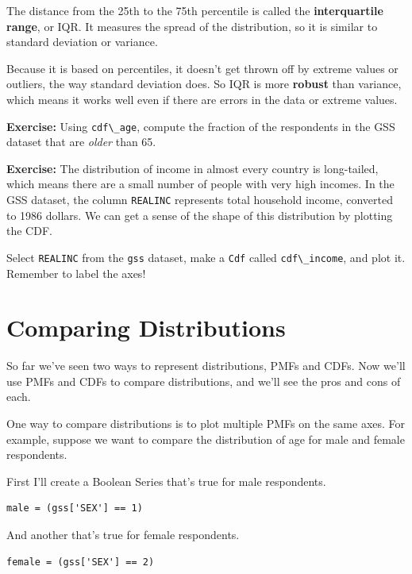 The distance from the 25th to the 75th percentile is called the
\textbf{interquartile range}, or IQR. It measures the spread of the
distribution, so it is similar to standard deviation or variance.

Because it is based on percentiles, it doesn't get thrown off by extreme
values or outliers, the way standard deviation does. So IQR is more
\textbf{robust} than variance, which means it works well even if there
are errors in the data or extreme values.

\textbf{Exercise:} Using \passthrough{\lstinline!cdf\_age!}, compute the
fraction of the respondents in the GSS dataset that are \emph{older}
than 65.

\textbf{Exercise:} The distribution of income in almost every country is
long-tailed, which means there are a small number of people with very
high incomes. In the GSS dataset, the column
\passthrough{\lstinline!REALINC!} represents total household income,
converted to 1986 dollars. We can get a sense of the shape of this
distribution by plotting the CDF.

Select \passthrough{\lstinline!REALINC!} from the
\passthrough{\lstinline!gss!} dataset, make a
\passthrough{\lstinline!Cdf!} called
\passthrough{\lstinline!cdf\_income!}, and plot it. Remember to label
the axes!

\hypertarget{comparing-distributions}{%
\section{Comparing Distributions}\label{comparing-distributions}}

So far we've seen two ways to represent distributions, PMFs and CDFs.
Now we'll use PMFs and CDFs to compare distributions, and we'll see the
pros and cons of each.

One way to compare distributions is to plot multiple PMFs on the same
axes. For example, suppose we want to compare the distribution of age
for male and female respondents.

First I'll create a Boolean Series that's true for male respondents.

\begin{lstlisting}[]
male = (gss['SEX'] == 1)
\end{lstlisting}

And another that's true for female respondents.

\begin{lstlisting}[]
female = (gss['SEX'] == 2)
\end{lstlisting}


